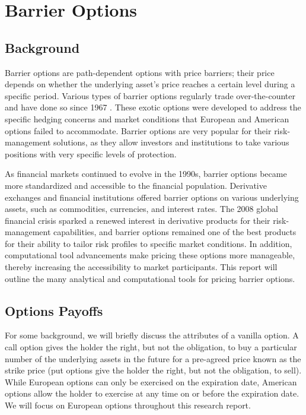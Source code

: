 %
\chapter{Barrier Options}
\section{Background}
Barrier options are path-dependent options with price barriers; their price depends on whether the underlying asset's price reaches a certain level during a specific period. Various types of barrier options regularly trade over-the-counter and have done so since 1967 \cite{JohnRubinstein1985}. These exotic options were developed to address the specific hedging concerns and market conditions that European and American options failed to accommodate. Barrier options are very popular for their risk-management solutions, as they allow investors and institutions to take various positions with very specific levels of protection.

As financial markets continued to evolve in the 1990s, barrier options became more standardized and accessible to the financial population. Derivative exchanges and financial institutions offered barrier options on various underlying assets, such as commodities, currencies, and interest rates. The 2008 global financial crisis sparked a renewed interest in derivative products for their risk-management capabilities, and barrier options remained one of the best products for their ability to tailor risk profiles to specific market conditions. In addition, computational tool advancements make pricing these options more manageable, thereby increasing the accessibility to market participants. This report will outline the many analytical and computational tools for pricing barrier options.

\section{Options Payoffs}
For some background, we will briefly discuss the attributes of a vanilla option. A call option gives the holder the right, but not the obligation, to buy a particular number of the underlying assets in the future for a pre-agreed price known as the strike price (put options give the holder the right, but not the obligation, to sell). While European options can only be exercised on the expiration date, American options allow the holder to exercise at any time on or before the expiration date. We will focus on European options throughout this research report.

